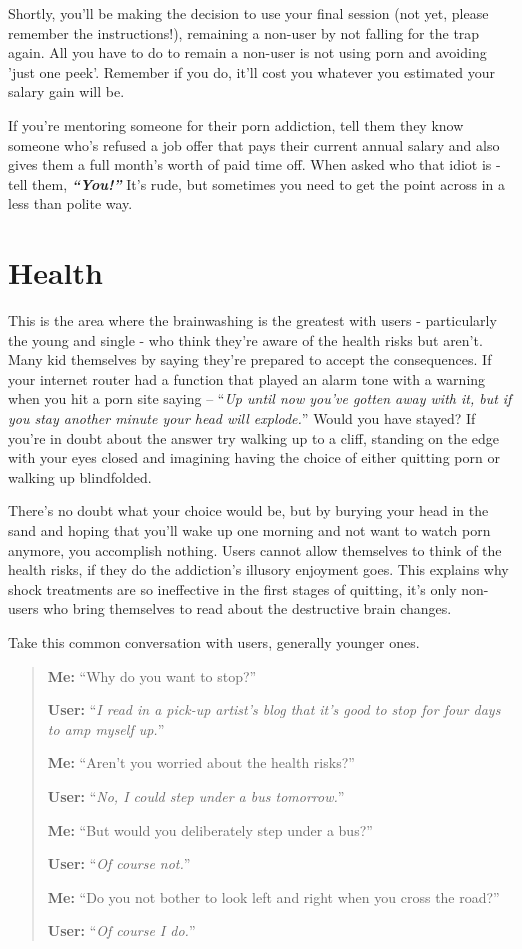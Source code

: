 \documentclass[
]{book}
\begin{document}
Shortly, you'll be making the decision to use your final session (not yet, please remember the instructions!), remaining a non-user by not falling for the trap again. All you have to do to remain a non-user is not using porn and avoiding 'just one peek'. Remember if you do, it'll cost you whatever you estimated your salary gain will be.

If you're mentoring someone for their porn addiction, tell them they know someone who's refused a job offer that pays their current annual salary and also gives them a full month's worth of paid time off. When asked who that idiot is - tell them, \textbf{\emph{``You!''}} It's rude, but sometimes you need to get the point across in a less than polite way.

\hypertarget{health}{%
\chapter{Health}\label{health}}

This is the area where the brainwashing is the greatest with users - particularly the young and single - who think they're aware of the health risks but aren't. Many kid themselves by saying they're prepared to accept the consequences. If your internet router had a function that played an alarm tone with a warning when you hit a porn site saying -- ``\emph{Up until now you've gotten away with it, but if you stay another minute your head will explode.}'' Would you have stayed? If you're in doubt about the answer try walking up to a cliff, standing on the edge with your eyes closed and imagining having the choice of either quitting porn or walking up blindfolded.

There's no doubt what your choice would be, but by burying your head in the sand and hoping that you'll wake up one morning and not want to watch porn anymore, you accomplish nothing. Users cannot allow themselves to think of the health risks, if they do the addiction's illusory enjoyment goes. This explains why shock treatments are so ineffective in the first stages of quitting, it's only non-users who bring themselves to read about the destructive brain changes.

Take this common conversation with users, generally younger ones.

\begin{quote}
\textbf{Me:} ``Why do you want to stop?''

\textbf{User:} ``\emph{I read in a pick-up artist's blog that it's good to stop for four days to amp myself up.}''

\textbf{Me:} ``Aren't you worried about the health risks?''

\textbf{User:} ``\emph{No, I could step under a bus tomorrow.}''

\textbf{Me:} ``But would you deliberately step under a bus?''

\textbf{User:} ``\emph{Of course not.}''

\textbf{Me:} ``Do you not bother to look left and right when you cross the road?''

\textbf{User:} ``\emph{Of course I do.}''
\end{quote}
\end{document}
